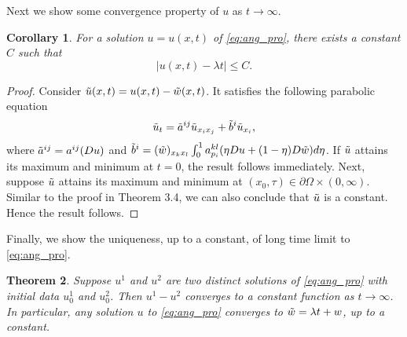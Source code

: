 \documentclass[12pt]{article}
\numberwithin{equation}{section}
\theoremstyle{plain}
\newtheorem{theorem}{Theorem}[section]
\newtheorem{corollary}[theorem]{Corollary}
\theoremstyle{definition}
\theoremstyle{remark}
\begin{document}
Next we show some convergence property of $u$ as $t\longrightarrow\infty$.
\begin{corollary}
For a solution $u=u(x,t)$ of \eqref{eq:ang_pro}, there exists a constant $C$ such that
\begin{equation}
    |u(x,t)-\lambda t| \leq C.
\end{equation}   
\end{corollary}
\begin{proof}
 Consider $\Tilde{u}(x,t) = u(x,t) - \Tilde{w}(x,t)$. It satisfies the following parabolic equation
\begin{equation*}
    \Tilde{u}_t = \Tilde{a}^{ij} \Tilde{u}_{x_i x_j} + \Tilde{b}^{i} \Tilde{u}_{x_i},
\end{equation*}
where $\Tilde{a}^{ij} = a^{ij} (Du)$ and $\Tilde{b}^{i} = (\Tilde{w})_{x_k x_l} \int^1_0 a^{kl}_{p_i} (\eta Du + (1-\eta) D\Tilde{w} ) d\eta $. If $\Tilde{u}$ attains its maximum and minimum at $t=0$, the result follows immediately. Next,
suppose $\Tilde{u}$ attains its maximum and minimum at $(x_0,\tau) \in \partial\Omega \times (0,\infty)$. Similar to the proof in Theorem 3.4, we can also conclude that $\Tilde{u}$ is a constant. Hence the result follows.
\end{proof}
Finally, we show the uniqueness, up to a constant, of long time limit to \eqref{eq:ang_pro}.
\begin{theorem}
Suppose $u^1$ and $u^2$ are two distinct solutions of \eqref{eq:ang_pro} with initial data $u_0^1$ and $u_0^2$. Then $u^1-u^2$
converges to a constant function as $t\rightarrow \infty$. In particular, any solution $u$ to \eqref{eq:ang_pro} 
converges to $\Tilde{w}=\lambda t+w$, up to a constant.  
\end{theorem}
\end{document}
